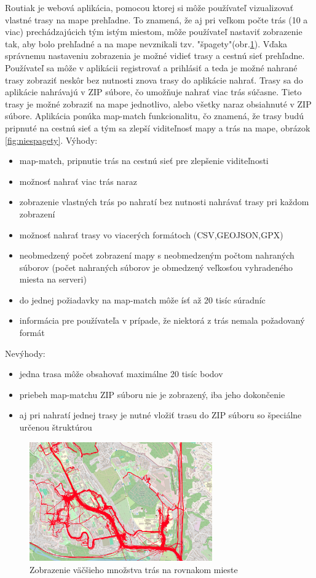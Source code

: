 \indent Routiak je webová aplikácia, pomocou ktorej si môže používateľ vizualizovať vlastné trasy na mape prehľadne. To znamená, že aj pri veľkom počte trás (10 a viac) prechádzajúcich tým istým miestom, môže používateľ nastaviť zobrazenie tak, aby bolo prehľadné a na mape nevznikali tzv. "špagety"(obr.\ref{fig:spagety}). Vďaka správnemu nastaveniu zobrazenia je možné vidieť trasy a cestnú sieť prehľadne. Používateľ sa môže v aplikácii registrovať a prihlásiť a teda je možné nahrané trasy zobraziť neskôr bez nutnosti znova trasy do aplikácie nahrať. Trasy sa do aplikácie nahrávajú v ZIP súbore, čo umožňuje nahrať viac trás súčasne. Tieto trasy je možné zobraziť na mape jednotlivo, alebo všetky naraz obsiahnuté v ZIP súbore. Aplikácia ponúka map-match funkcionalitu, čo znamená, že trasy budú pripnuté na cestnú sieť a tým sa zlepší viditeľnosť mapy a trás na mape, obrázok \ref{fig:niespagety}. 
\newline Výhody:
\begin{itemize}
  \item map-match, pripnutie trás na cestnú sieť pre zlepšenie viditeľnosti
  \item možnosť nahrať viac trás naraz
  \item zobrazenie vlastných trás po nahratí bez nutnosti nahrávať trasy pri každom zobrazení
  \item možnosť nahrať trasy vo viacerých formátoch (CSV,GEOJSON,GPX)
  \item neobmedzený počet zobrazení mapy s neobmedzeným počtom nahraných súborov (počet nahraných súborov je obmedzený veľkosťou vyhradeného miesta na serveri)
  \item do jednej požiadavky na map-match môže ísť až 20 tisíc súradníc
  \item informácia pre používateľa v prípade, že niektorá z trás nemala požadovaný formát 
\end{itemize}
Nevýhody:
\begin{itemize}
  \item jedna trasa môže obsahovať maximálne 20 tisíc bodov
  \item priebeh map-matchu ZIP súboru nie je zobrazený, iba jeho dokončenie
  \item aj pri nahratí jednej trasy je nutné vložiť trasu do ZIP súboru so špeciálne určenou štruktúrou
\end{itemize}
\begin{figure}[H]
  \centering
  \includegraphics[width=0.7\textwidth]{img/map-match rozdiel/pred map-match.png}
  \caption{Zobrazenie väčšieho množstva trás na rovnakom mieste}
  \label{fig:spagety}
\end{figure}
